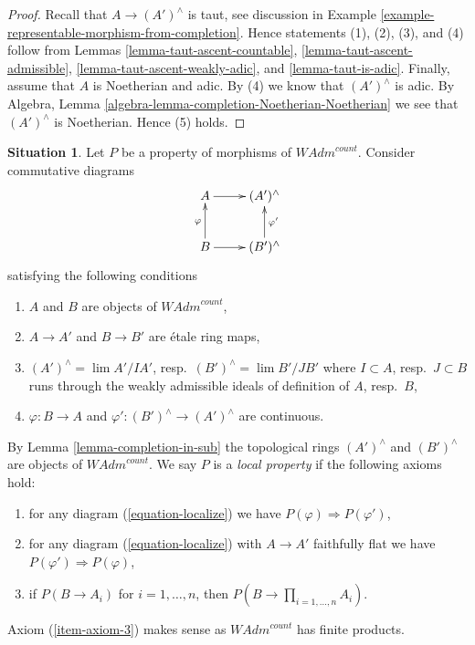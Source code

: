 \documentclass{stacks-project}
\theoremstyle{plain}
\theoremstyle{definition}
\newtheorem{situation}[subsection]{Situation}
\theoremstyle{remark}
\numberwithin{equation}{subsection}
\def\lim{\mathop{\mathrm{lim}}\nolimits}
\begin{document}
\begin{proof}
Recall that $A \to (A')^\wedge$ is taut, see discussion in
Example \ref{example-representable-morphism-from-completion}.
Hence statements (1), (2), (3), and (4) follow from Lemmas
\ref{lemma-taut-ascent-countable},
\ref{lemma-taut-ascent-admissible},
\ref{lemma-taut-ascent-weakly-adic}, and
\ref{lemma-taut-is-adic}.
Finally, assume that $A$ is Noetherian and adic.
By (4) we know that $(A')^\wedge$ is adic.
By Algebra, Lemma \ref{algebra-lemma-completion-Noetherian-Noetherian}
we see that $(A')^\wedge$ is Noetherian. Hence (5) holds.
\end{proof}

\begin{situation}
\label{situation-local-property}
Let $P$ be a property of morphisms of $\textit{WAdm}^{count}$.
Consider commutative diagrams
\begin{equation}
\label{equation-localize}
\vcenter{
\xymatrix{
A \ar[r] & (A')^\wedge \\
B \ar[r] \ar[u]^\varphi & (B')^\wedge \ar[u]_{\varphi'}
}
}
\end{equation}
satisfying the following conditions
\begin{enumerate}
\item $A$ and $B$ are objects of $\textit{WAdm}^{count}$,
\item $A \to A'$ and $B \to B'$ are \'etale ring maps,
\item $(A')^\wedge = \lim A'/IA'$, resp.\  $(B')^\wedge = \lim B'/JB'$
where $I \subset A$, resp.\ $J \subset B$
runs through the weakly admissible ideals of definition of $A$, resp.\ $B$,
\item $\varphi : B \to A$ and $\varphi' : (B')^\wedge \to (A')^\wedge$
are continuous.
\end{enumerate}
By Lemma \ref{lemma-completion-in-sub} the topological rings
$(A')^\wedge$ and $(B')^\wedge$ are objects of $\textit{WAdm}^{count}$.
We say $P$ is a {\it local property} if the following axioms hold:
\begin{enumerate}
\item
\label{item-axiom-1}
for any diagram (\ref{equation-localize}) we have
$P(\varphi) \Rightarrow P(\varphi')$,
\item
\label{item-axiom-2}
for any diagram (\ref{equation-localize}) with $A \to A'$
faithfully flat we have
$P(\varphi') \Rightarrow P(\varphi)$,
\item
\label{item-axiom-3}
if $P(B \to A_i)$ for $i = 1, \ldots, n$, then
$P(B \to \prod_{i = 1, \ldots, n} A_i)$.
\end{enumerate}
Axiom (\ref{item-axiom-3})
makes sense as $\textit{WAdm}^{count}$ has finite products.
\end{situation}
\end{document}
